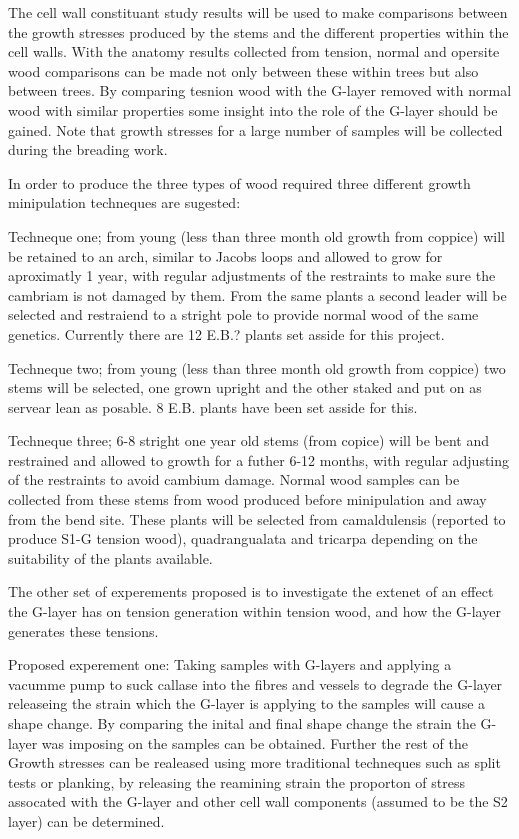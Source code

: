 \documentclass{article}
\begin{document}
The cell wall constituant study results will be used to make comparisons between
the growth stresses produced by the stems and the different properties within
the cell walls. With the anatomy results collected from tension, normal and
opersite wood comparisons can be made not only between these within trees but
also between trees. By comparing tesnion wood with the G-layer removed with
normal wood with similar properties some insight into the role of the G-layer
should be gained. Note that growth stresses for a large number of samples will
be collected during the breading work.

In order to produce the three types of wood required three different growth
minipulation techneques are sugested:

Techneque one; from young (less than three month old growth from coppice) will
be retained to an arch, similar to Jacobs loops and allowed to grow for
aproximatly 1 year, with regular adjustments of the restraints to make sure the
cambriam is not damaged by them. From the same plants a second leader will
be selected and restraiend to a stright pole to provide normal wood of the same
genetics. Currently there are 12 E.B.? plants set asside for this project.

Techneque two; from young (less than three month old growth from coppice) two
stems will be selected, one grown upright and the other staked and put on
as servear lean as posable. 8 E.B. plants have been set asside for this.

Techneque three; 6-8 stright one year old stems (from copice) will be bent and
restrained and allowed to growth for a futher 6-12 months, with regular
adjusting of the restraints to avoid cambium damage. Normal wood samples can be
collected from these stems from wood produced before minipulation and away from
the bend site. These plants will be selected from camaldulensis (reported to
produce S1-G tension wood), quadrangualata and tricarpa depending on the
suitability of the plants available.

The other set of experements proposed is to investigate the extenet of an effect
the G-layer has on tension generation within tension wood, and how the G-layer
generates these tensions.

Proposed experement one:
Taking samples with G-layers and applying a vacumme pump to suck callase into
the fibres and vessels to degrade the G-layer releaseing the strain which the
G-layer is applying to the samples will cause a shape change. By comparing the
inital and final shape change the strain the G-layer was imposing on the samples
can be obtained. Further the rest of the Growth stresses can be realeased using
more traditional techneques such as split tests or planking, by releasing the
reamining strain the proporton of stress assocated with the G-layer and other
cell wall components (assumed to be the S2 layer) can be determined.
\end{document}
